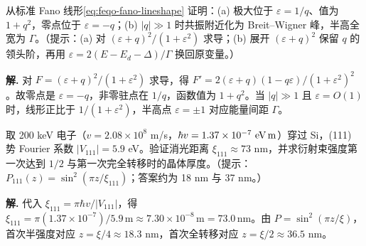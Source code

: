 \par
\begin{workedexample}
从标准 Fano 线形\cref{eq:feqo-fano-lineshape} 证明：(a) 极大位于 \(\varepsilon=1/q\)、值为 \(1+q^2\)，零点位于 \(\varepsilon=-q\)；(b) \(|q|\gg1\) 时共振附近化为 Breit--Wigner 峰，半高全宽为 \(\Gamma\)。（提示：(a) 对 \((\varepsilon+q)^2/(1+\varepsilon^2)\) 求导；(b) 展开 \((\varepsilon+q)^2\) 保留 \(q\) 的领头阶，再用 \(\varepsilon=2(E-E_d-\Delta)/\Gamma\) 换回原变量。）

\textbf{解.} 对 \(F=(\varepsilon+q)^2/(1+\varepsilon^2)\) 求导，得 \(F'=2(\varepsilon+q)(1-q\varepsilon)/(1+\varepsilon^2)^2\)。故零点是 \(\varepsilon=-q\)，非零驻点在 \(1/q\)，函数值为 \(1+q^2\)。当 \(|q|\gg1\) 且 \(\varepsilon=O(1)\) 时，线形正比于 \(1/(1+\varepsilon^2)\)，半高点 \(\varepsilon=\pm1\) 对应能量间距 \(\Gamma\)。
\end{workedexample}
\par






\par
\begin{workedexample}
取 200 keV 电子（\(v=2.08\times10^8\) m/s，\(\hbar v=1.37\times10^{-7}\ \text{eV\,m}\)）穿过 Si，(111) 势 Fourier 系数 \(|V_{111}|=5.9\) eV。验证消光距离 \(\xi_{111}\approx73\) nm，并求衍射束强度第一次达到 \(1/2\) 与第一次完全转移时的晶体厚度。（提示：\(P_{111}(z)=\sin^2(\pi z/\xi_{111})\)；答案约为 18 nm 与 37 nm。）

\textbf{解.} 代入 \(\xi_{111}=\pi\hbar v/|V_{111}|\)，得 \(\xi_{111}=\pi(1.37\times10^{-7})/5.9\,\mathrm m\approx7.30\times10^{-8}\,\mathrm m=73.0\,\mathrm{nm}\)。由 \(P=\sin^2(\pi z/\xi)\)，首次半强度对应 \(z=\xi/4\approx18.3\) nm，首次全转移对应 \(z=\xi/2\approx36.5\) nm。
\end{workedexample}
\par

